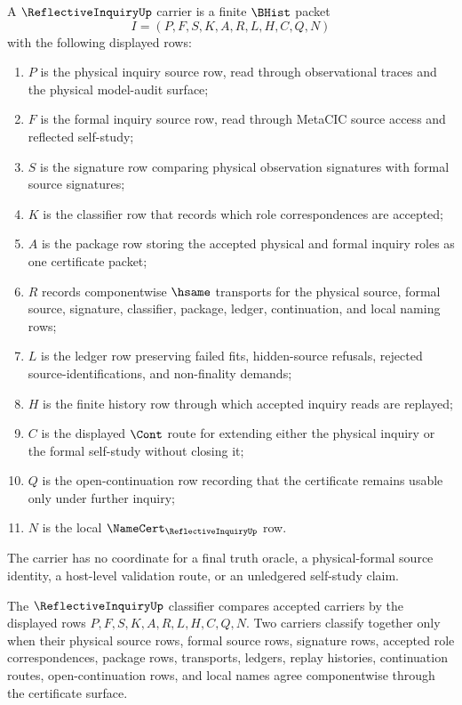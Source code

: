 \begin{definition}
\label{def:reflective-inquiry-carrier}
A $\ReflectiveInquiryUp$ carrier is a finite $\BHist$ packet
$$
I=(P,F,S,K,A,R,L,H,C,Q,N)
$$
with the following displayed rows:
\begin{enumerate}
\item $P$ is the physical inquiry source row, read through observational traces and the physical model-audit surface;
\item $F$ is the formal inquiry source row, read through MetaCIC source access and reflected self-study;
\item $S$ is the signature row comparing physical observation signatures with formal source signatures;
\item $K$ is the classifier row that records which role correspondences are accepted;
\item $A$ is the package row storing the accepted physical and formal inquiry roles as one certificate packet;
\item $R$ records componentwise $\hsame$ transports for the physical source, formal source, signature, classifier, package, ledger, continuation, and local naming rows;
\item $L$ is the ledger row preserving failed fits, hidden-source refusals, rejected source-identifications, and non-finality demands;
\item $H$ is the finite history row through which accepted inquiry reads are replayed;
\item $C$ is the displayed $\Cont$ route for extending either the physical inquiry or the formal self-study without closing it;
\item $Q$ is the open-continuation row recording that the certificate remains usable only under further inquiry;
\item $N$ is the local $\NameCert_{\ReflectiveInquiryUp}$ row.
\end{enumerate}
The carrier has no coordinate for a final truth oracle, a physical-formal source identity, a host-level validation route, or an unledgered self-study claim.
\end{definition}

\begin{definition}
\label{def:reflective-inquiry-classifier}
The $\ReflectiveInquiryUp$ classifier compares accepted carriers by the displayed rows $P,F,S,K,A,R,L,H,C,Q,N$. Two carriers classify together only when their physical source rows, formal source rows, signature rows, accepted role correspondences, package rows, transports, ledgers, replay histories, continuation routes, open-continuation rows, and local names agree componentwise through the certificate surface.
\end{definition}


